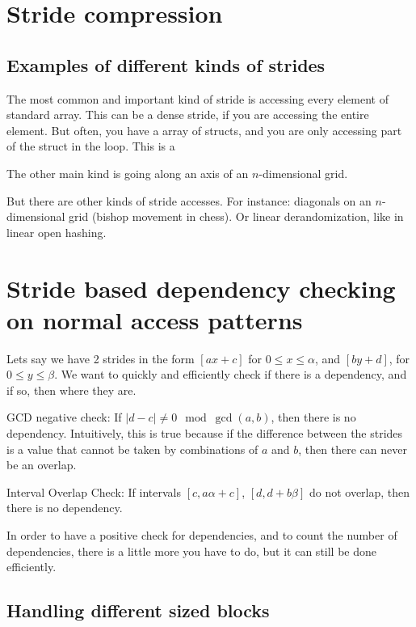 \documentclass[12pt,twoside]{reedthesis}
\begin{document}
		
	\section{Stride compression}
		
		\subsection{Examples of different kinds of strides}
		The most common and important kind of stride is accessing every element of standard array. This can be a dense stride, if you are accessing the entire element. But often, you have a array of structs, and you are only accessing part of the struct in the loop. This is a $ $
		
		The other main kind is going along an axis of an $n$-dimensional grid. 
		
		But there are other kinds of stride accesses. For instance: diagonals on an $n$-dimensional grid (bishop movement in chess). Or linear derandomization, like in linear open hashing. 
		
	\section{Stride based dependency checking on normal access patterns}
		
		Lets say we have 2 strides in the form $[ax+c]$ for $0\le x \le \alpha$, and $[by+d]$, for $0 \le y \le \beta$. We want to quickly and efficiently check if there is a dependency, and if so, then where they are. 
		
		GCD negative check: If $|d-c| \ne 0 \mod \gcd(a,b)$, then there is no dependency. Intuitively, this is true because if the difference between the strides is a value that cannot be taken by combinations of $a$ and $b$, then there can never be an overlap. 
		
		Interval Overlap Check: If intervals $[c,a\alpha+c]$, $[d,d+b\beta]$ do not overlap, then there is no dependency. 
		
		In order to have a positive check for dependencies, and to count the number of dependencies, there is a little more you have to do, but it can still be done efficiently. 
		
		\subsection{Handling different sized blocks}
		
\end{document}
